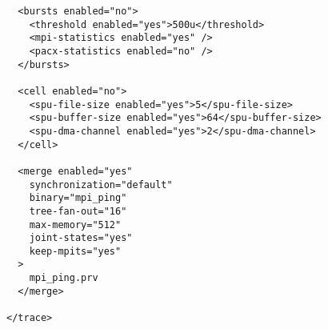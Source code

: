 \begin{verbatim}
  <bursts enabled="no">
    <threshold enabled="yes">500u</threshold>
    <mpi-statistics enabled="yes" />
    <pacx-statistics enabled="no" />
  </bursts>

  <cell enabled="no">
    <spu-file-size enabled="yes">5</spu-file-size>
    <spu-buffer-size enabled="yes">64</spu-buffer-size>
    <spu-dma-channel enabled="yes">2</spu-dma-channel>
  </cell>

  <merge enabled="yes" 
    synchronization="default"
    binary="mpi_ping"
    tree-fan-out="16"
    max-memory="512"
    joint-states="yes"
    keep-mpits="yes"
  >
    mpi_ping.prv 
  </merge>

</trace>
\end{verbatim}
